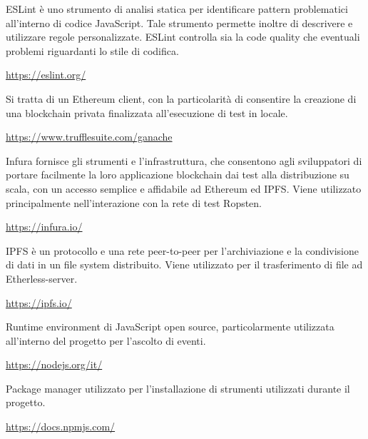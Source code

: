	ESLint è uno strumento di analisi statica per identificare pattern problematici all'interno di codice JavaScript. Tale strumento permette inoltre di descrivere e utilizzare regole personalizzate. ESLint controlla sia la code quality che eventuali problemi riguardanti lo stile di codifica.
	\begin{center}
		\url{https://eslint.org/}
	\end{center}

	Si tratta di un Ethereum client, con la particolarità di consentire la creazione di una blockchain privata finalizzata all'esecuzione di test in locale.
	\begin{center}
		\url{https://www.trufflesuite.com/ganache}
	\end{center}

	Infura fornisce gli strumenti e l'infrastruttura, che consentono agli sviluppatori di portare facilmente la loro applicazione blockchain dai test alla distribuzione su scala, con un accesso semplice e affidabile ad Ethereum ed IPFS. Viene utilizzato principalmente nell'interazione con la rete di test Ropsten.
	\begin{center}
		\url{https://infura.io/}
	\end{center}

	IPFS è un protocollo e una rete peer-to-peer per l'archiviazione e la condivisione di dati in un file system distribuito. Viene utilizzato per il trasferimento di file ad Etherless-server.
	\begin{center}
		\url{https://ipfs.io/}
	\end{center}

	Runtime environment di JavaScript open source, particolarmente utilizzata all'interno del progetto per l'ascolto di eventi.
	\begin{center}
		\url{https://nodejs.org/it/}
	\end{center}

	Package manager utilizzato per l'installazione di strumenti utilizzati durante il progetto.
	\begin{center}
		\url{https://docs.npmjs.com/}
	\end{center}

